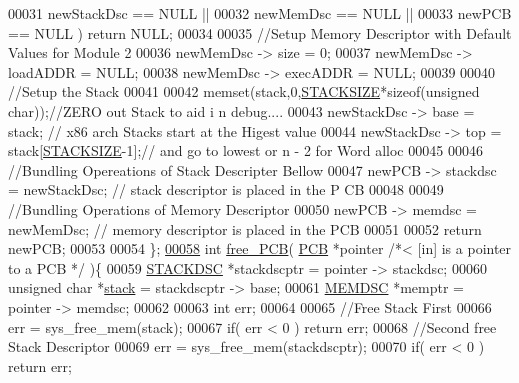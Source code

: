 \begin{DoxyCode}
00031                  newStackDsc == NULL || 
00032                  newMemDsc == NULL || 
00033                  newPCB == NULL ) \textcolor{keywordflow}{return} NULL;
00034         
00035         \textcolor{comment}{//Setup Memory Descriptor with Default Values for Module 2}
00036         newMemDsc -> size = 0;
00037         newMemDsc -> loadADDR = NULL;
00038         newMemDsc -> execADDR = NULL;
00039         
00040         \textcolor{comment}{//Setup the Stack}
00041 
00042         memset(stack,0,\hyperlink{mpx__r2_8h_a21d9543c516fffee84a7963224271f95}{STACKSIZE}*\textcolor{keyword}{sizeof}(\textcolor{keywordtype}{unsigned} \textcolor{keywordtype}{char}));\textcolor{comment}{//ZERO out Stack to aid i
      n debug....}
00043         newStackDsc -> base = stack; \textcolor{comment}{// x86 arch Stacks start at the Higest value
       }
00044         newStackDsc -> top  = stack[\hyperlink{mpx__r2_8h_a21d9543c516fffee84a7963224271f95}{STACKSIZE}-1];\textcolor{comment}{// and go to lowest or n - 2 for
       Word alloc }
00045         
00046         \textcolor{comment}{//Bundling Opereations of Stack Descripter Bellow}
00047         newPCB -> stackdsc = newStackDsc;  \textcolor{comment}{// stack descriptor is placed in the P
      CB}
00048         
00049         \textcolor{comment}{//Bundling Operations of Memory Descriptor }
00050         newPCB -> memdsc = newMemDsc; \textcolor{comment}{// memory descriptor is placed in the PCB}
00051         
00052         \textcolor{keywordflow}{return} newPCB;
00053         
00054 \};
\hypertarget{mpx__r2_8c_source_l00058}{}\hyperlink{mpx__r2_8h_a79890f055b1d0fccf1962bbde4877caa}{00058} \textcolor{keywordtype}{int} \hyperlink{mpx__r2_8c_a79890f055b1d0fccf1962bbde4877caa}{free_PCB}( \hyperlink{structprocess}{PCB} *pointer \textcolor{comment}{/*< [in] is a pointer to a PCB  */} )\{
00059         \hyperlink{structstack}{STACKDSC} *stackdscptr = pointer -> stackdsc;
00060         \textcolor{keywordtype}{unsigned} \textcolor{keywordtype}{char} *\hyperlink{structstack}{stack} = stackdscptr -> base;
00061         \hyperlink{structmem}{MEMDSC} *memptr = pointer -> memdsc;
00062         
00063         \textcolor{keywordtype}{int} err;
00064         
00065         \textcolor{comment}{//Free Stack First}
00066         err = sys\_free\_mem(stack);
00067         \textcolor{keywordflow}{if}( err < 0 ) \textcolor{keywordflow}{return} err;
00068         \textcolor{comment}{//Second free Stack Descriptor}
00069         err = sys\_free\_mem(stackdscptr);
00070         \textcolor{keywordflow}{if}( err < 0 ) \textcolor{keywordflow}{return} err;

\end{DoxyCode}
